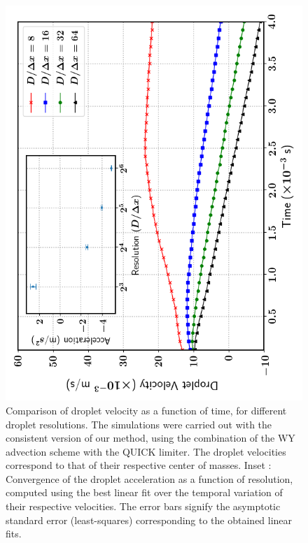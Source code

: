 \begin{figure}
\begin{center}
\includegraphics[width = 1.0\textwidth]{plots/raindrop/jcp_2.png}
\end{center}
\vspace*{-0.5cm}
\caption{Comparison of droplet velocity as a function of time, 
for different droplet resolutions.
The simulations were carried out with the consistent version of our method,
using the combination of the WY advection scheme with the QUICK limiter. 
The droplet velocities correspond to that of their respective center of masses. 
Inset : Convergence of the droplet acceleration as a function of resolution, 
computed using the best linear fit over the temporal variation 
of their respective velocities. 
The error bars signify the asymptotic standard 
error (least-squares) corresponding to the obtained linear fits.} 
\label{drop_vel_jcp}
\end{figure}


